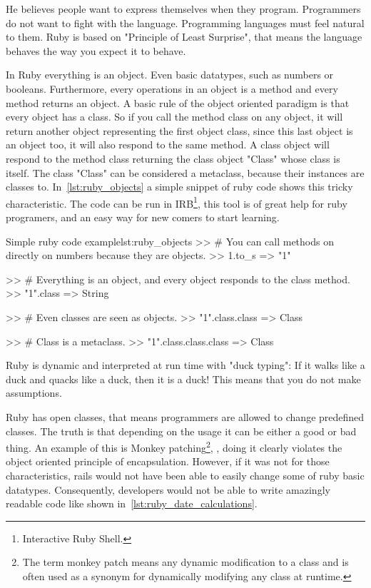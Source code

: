 He believes people want to express themselves when they program. 
Programmers do not want to fight with the language.
Programming languages must feel natural to them.
Ruby is based on "Principle of Least Surprise", 
that means the language behaves the way you expect it to behave.

In Ruby everything is an object. Even basic datatypes, such as numbers or booleans.
Furthermore, every operations in an object is a method and every method returns an object.
A basic rule of the object oriented paradigm is that every object has a class.
So if you call the method class on any object,
it will return another object representing the first object class, 
since this last object is an object too, 
it will also respond to the same method. 
A class object will respond to the method class returning the class object "Class" whose class is itself. 
The class "Class" can be considered a metaclass, because their instances are classes to.
In~\ref{lst:ruby_objects} a simple snippet of ruby code shows this tricky characteristic.
The code can be run in 
\textsf{IRB}\footnote{Interactive Ruby Shell.}, this tool is of great help for ruby programers,
and an easy way for new comers to start learning.

\begin{rubycode}{Simple ruby code example}{lst:ruby_objects}
  >> # You can call methods on directly on numbers because they are objects.
  >> 1.to_s
  => "1"

  >> # Everything is an object, and every object responds to the class method.
  >> "1".class
  => String

  >> # Even classes are seen as objects.
  >> "1".class.class
  => Class

  >> # Class is a metaclass. 
  >> "1".class.class.class
  => Class
\end{rubycode}

Ruby is dynamic and interpreted at run time with "duck typing": 
If it walks like a duck and quacks like a duck, then it is a duck! This means that you do not make assumptions.

Ruby has open classes, that means programmers are allowed to change predefined classes.
The truth is that depending on the usage it can be either a good or bad thing. 
An example of this is 
\textsf{Monkey patching}\footnote{
  The term monkey patch means any dynamic modification to a class and 
  is often used as a synonym for dynamically modifying any class at runtime.
},
, doing it clearly violates the object oriented principle of encapsulation.
However, if it was not for those characteristics, 
rails would not have been able to easily change some of ruby basic datatypes. 
Consequently, developers would not be able to write amazingly readable code like shown in~\ref{lst:ruby_date_calculations}.

